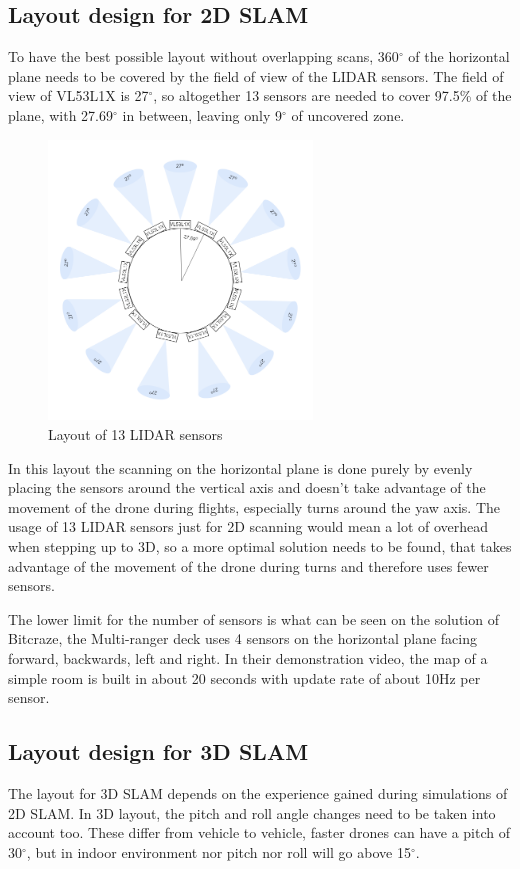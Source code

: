 \subsection{Layout design for 2D SLAM}
To have the best possible layout without overlapping scans, 360$^{\circ}$ of the horizontal plane 
needs to be covered by the field of view of the LIDAR sensors. The field of view of VL53L1X is 27$^{\circ}$,
so altogether 13 sensors are needed to cover 97.5\% of the plane, with 27.69$^{\circ}$ in between, leaving
only 9$^{\circ}$ of uncovered zone.

\begin{figure}[ht]
    \centering
    \includegraphics[width=70mm, keepaspectratio]{figures/2d_slam_13sensors.png}
    \caption{Layout of 13 LIDAR sensors}
    \label{fig:2d_13sensor_layout}
\end{figure}

In this layout the scanning on the horizontal plane is done purely by evenly placing the sensors 
around the vertical axis and doesn't take advantage of the movement of the drone during flights, especially 
turns around the yaw axis. The usage of 13 LIDAR sensors just for 2D scanning would mean 
a lot of overhead when stepping up to 3D, so a more optimal solution needs to be found, that takes
advantage of the movement of the drone during turns and therefore uses fewer sensors. 

The lower limit for the number of sensors is what can be seen on the solution of Bitcraze, 
the Multi-ranger deck\cite{BitcrazeMultirangerDeck} uses 4 sensors on the horizontal plane facing forward, 
backwards, left and right. In their demonstration video, the map of a simple room is built in 
about 20 seconds with update rate of about 10Hz per sensor. 

\subsection{Layout design for 3D SLAM}
The layout for 3D SLAM depends on the experience gained during simulations of 2D SLAM. In 3D layout,
the pitch and roll angle changes need to be taken into account too. These differ from vehicle to vehicle,
faster drones can have a pitch of 30$^{\circ}$, but in indoor environment nor pitch nor roll will go above
15$^{\circ}$. 

